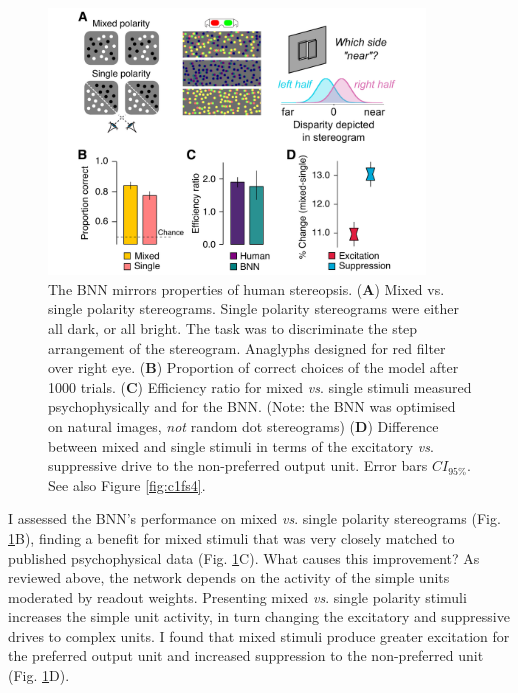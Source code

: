 {\begin{figure}[!h]
  \centering
  \includegraphics[width=10cm,keepaspectratio]{chapter1/chapter1-figs/Fig5.pdf}
  \caption[The BNN mirrors properties of human stereopsis.]{ The BNN mirrors properties of human stereopsis. ({\bf A}) Mixed vs. single polarity stereograms. Single polarity stereograms were either all dark, or all bright. The task was to discriminate the step arrangement of the stereogram. Anaglyphs designed for red filter over right eye. ({\bf B}) Proportion of correct choices of the model after 1000 trials. ({\bf C}) Efficiency ratio for mixed {\it vs}. single stimuli measured psychophysically \cite{Harris:1995va} and for the BNN. (Note: the BNN was optimised on natural images, {\it not} random dot stereograms) ({\bf D}) Difference between mixed and single stimuli in terms of the excitatory {\it vs}. suppressive drive to the non-preferred output unit. Error bars $CI_{95\%}$. See also Figure \ref{fig:c1fs4}.}
  \label{fig:c1f5}
\end{figure}

I assessed the BNN's performance on mixed {\it vs}. single polarity stereograms (Fig. \ref{fig:c1f5}B), finding a benefit for mixed stimuli that was very closely matched to published psychophysical data \cite{Harris:1995va, Read:2011im} (Fig. \ref{fig:c1f5}C). What causes this improvement? As reviewed above, the network depends on the activity of the simple units moderated by readout weights. Presenting mixed {\it vs}. single polarity stimuli increases the simple unit activity, in turn changing the excitatory and suppressive drives to complex units. I found that mixed stimuli produce greater excitation for the preferred output unit and increased suppression to the non-preferred unit (Fig. \ref{fig:c1f5}D). 

}
